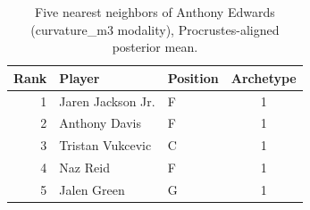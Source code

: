 \begin{table}[htbp]
  \centering\small
  \begin{tabular}{rllc}
    \toprule
    Rank & Player & Position & Archetype \\
    \midrule
    1 & Jaren Jackson Jr. & F & 1 \\
    2 & Anthony Davis & F & 1 \\
    3 & Tristan Vukcevic & C & 1 \\
    4 & Naz Reid & F & 1 \\
    5 & Jalen Green & G & 1 \\
    \bottomrule
  \end{tabular}
  \caption{Five nearest neighbors of Anthony Edwards (curvature_m3 modality), Procrustes-aligned posterior mean.}
  \label{tab:Anthony_Edwards_neighbors_curvature_m3}
\end{table}


